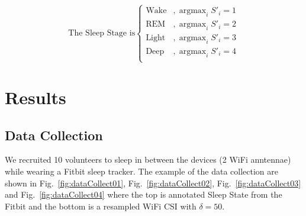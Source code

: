 \documentclass[10pt,letterpaper]{article}
\DeclareMathOperator*{\argmax}{argmax} %
\begin{document}
	
	\begin{equation}
		\text{The Sleep Stage is} \begin{cases}
			\text{Wake} & ,\argmax_i S'_i=1  \\
			\text{REM} & ,\argmax_i S'_i=2  \\
			\text{Light} & ,\argmax_i S'_i=3  \\
			\text{Deep} & ,\argmax_i S'_i=4  \\
		\end{cases}
		\label{eq:SSparserRV}
	\end{equation}	
	
	\section*{Results}
	
	\subsection*{Data Collection}
	
	We recruited 10 volunteers to sleep in between the devices (2 WiFi anntennae) while wearing a Fitbit sleep tracker. The example of the data collection are shown in Fig.~\ref{fig:dataCollect01}, Fig.~\ref{fig:dataCollect02}, Fig.~\ref{fig:dataCollect03} and Fig.~\ref{fig:dataCollect04} where the top is annotated Sleep State from the Fitbit and the bottom is a resampled WiFi CSI with $\delta = 50$.
	
\end{document}
